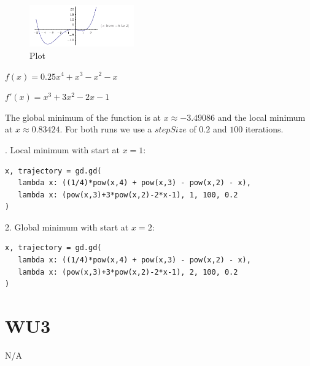 \begin{figure}[htbp]
	\centering
		\includegraphics[width=0.40\textwidth]{images/wu2_plot.png}
	\caption{Plot}
	\label{fig:wu2_plot}
\end{figure}


$f(x) = 0.25x^4 + x^3 - x^2 - x$

$f'(x) = x^3 + 3x^2 - 2x - 1$

The global minimum of the function is at $x \approx -3.49086$ and the local minimum at $x \approx 0.83424$.
For both runs we use a $stepSize$ of $0.2$ and $100$ iterations. 

. Local minimum with start at $x = 1$:
\begin{verbatim}
x, trajectory = gd.gd(	
   lambda x: ((1/4)*pow(x,4) + pow(x,3) - pow(x,2) - x),
   lambda x: (pow(x,3)+3*pow(x,2)-2*x-1), 1, 100, 0.2 
)
\end{verbatim}
2. Global minimum with start at $x = 2$:
\begin{verbatim}
x, trajectory = gd.gd(
   lambda x: ((1/4)*pow(x,4) + pow(x,3) - pow(x,2) - x), 
   lambda x: (pow(x,3)+3*pow(x,2)-2*x-1), 2, 100, 0.2
)
\end{verbatim}

\section{WU3}
N/A
